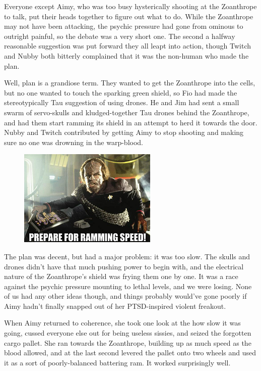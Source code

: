 Everyone except Aimy, who was too busy hysterically shooting at the Zoanthrope to talk, put their heads together to figure out what to do. 
While the Zoanthrope may not have been attacking, the psychic pressure had gone from ominous to outright painful, so the debate was a very short one. 
The second a halfway reasonable suggestion was put forward they all leapt into action, though Twitch and Nubby both bitterly complained that it was the non-human who made the plan.

Well, plan is a grandiose term. 
They wanted to get the Zoanthrope into the cells, but no one wanted to touch the sparking green shield, so Fio had made the stereotypically Tau suggestion of using drones. 
He and Jim had sent a small swarm of servo-skulls and kludged-together Tau drones behind the Zoanthrope, and had them start ramming its shield in an attempt to herd it towards the door. 
Nubby and Twitch contributed by getting Aimy to stop shooting and making sure no one was drowning in the warp-blood.
\begin{figure}
	\begin{center}
		\includegraphics[width=\figwidth]{pics/12/68.png}
	\end{center}
\end{figure}
The plan was decent, but had a major problem: 
it was too slow. 
The skulls and drones didn't have that much pushing power to begin with, and the electrical nature of the Zoanthrope's shield was frying them one by one. 
It was a race against the psychic pressure mounting to lethal levels, and we were losing. 
None of us had any other ideas though, and things probably would've gone poorly if Aimy hadn't finally snapped out of her PTSD-inspired violent freakout.

When Aimy returned to coherence, she took one look at the how slow it was going, cussed everyone else out for being useless sissies, and seized the forgotten cargo pallet. 
She ran towards the Zoanthrope, building up as much speed as the blood allowed, and at the last second levered the pallet onto two wheels and used it as a sort of poorly-balanced battering ram. 
It worked surprisingly well.

